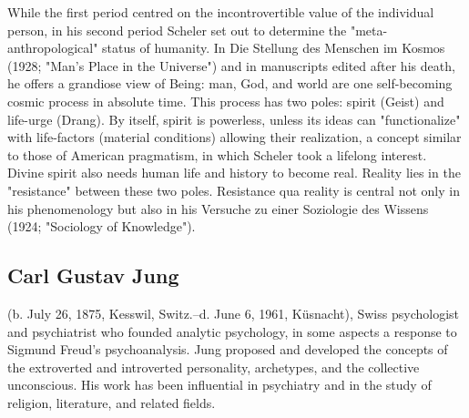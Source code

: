 \documentclass[12pt]{article}
\begin{document}
                                      While the first period centred on the incontrovertible value of the
                                      individual person, in his second period Scheler set out to determine
                                      the "meta-anthropological" status of humanity. In Die Stellung des
                                      Menschen im Kosmos (1928; "Man's Place in the Universe") and in
                                      manuscripts edited after his death, he offers a grandiose view of
                                      Being: man, God, and world are one self-becoming cosmic process in
                                      absolute time. This process has two poles: spirit (Geist) and
                                      life-urge (Drang). By itself, spirit is powerless, unless its ideas can
                                      "functionalize" with life-factors (material conditions) allowing their
                                      realization, a concept similar to those of American pragmatism, in
                                      which Scheler took a lifelong interest. Divine spirit also needs
                                      human life and history to become real. Reality lies in the "resistance"
                                      between these two poles. Resistance qua reality is central not only in
                                      his phenomenology but also in his Versuche zu einer Soziologie des
                                      Wissens (1924; "Sociology of Knowledge"). 


\subsection{Carl Gustav Jung}
(b. July 26, 1875, Kesswil, Switz.--d. June 6, 1961, K\"{u}snacht), Swiss
                                      psychologist and psychiatrist who founded analytic psychology, in
                                      some aspects a response to Sigmund Freud's psychoanalysis. Jung
                                      proposed and developed the concepts of the extroverted and
                                      introverted personality, archetypes, and the collective unconscious.
                                      His work has been influential in psychiatry and in the study of
                                      religion, literature, and related fields. 
\end{document}
